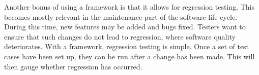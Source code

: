 Another bonus of using a framework is that it allows for regression testing. This becomes mostly relevant in the maintenance part of the software life cycle. During this time, new features may be added and bugs fixed. Testers want to ensure that such changes do not lead to regression,  where software quality deteriorates. With a framework, regression testing is simple. Once a set of test cases have been set up, they can be run after a change has been made. This will then  gauge whether regression has occurred.


